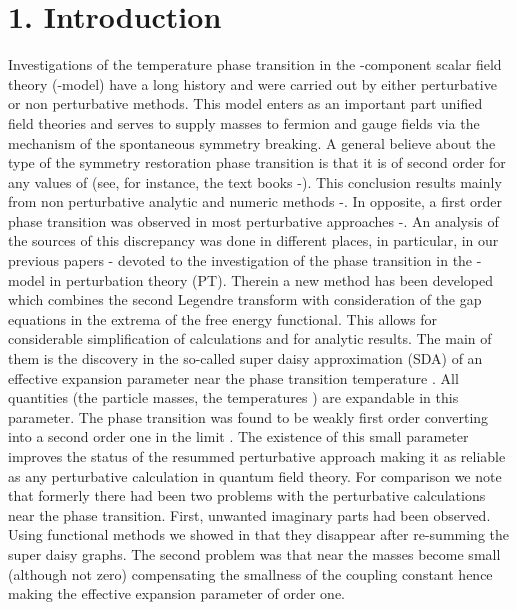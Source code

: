 \documentclass[a4paper,12pt]{article}
\begin{document}
\section*{1. Introduction}
Investigations of the temperature phase transition in the
\coordHE{}-component scalar field theory (\coordHE{}-model) have a long history
and were carried out by either perturbative or non perturbative
methods. This model enters as an important part unified field theories
and serves to supply masses to fermion and gauge fields via the
mechanism of the spontaneous symmetry breaking. A general believe
about the type of the symmetry restoration phase transition is that it
is of second order for any values of \coordHE{} (see, for instance, the text
books \cite{Zinn}-\cite{Kapusta}). This conclusion results mainly from
non perturbative analytic and numeric methods
\cite{Tetradis}-\cite{Fodor}. In opposite, a first order phase
transition was observed in most perturbative approaches
\cite{Takahashi}-\cite{pl}. An analysis of the sources of this
discrepancy was done in different places, in particular, in our
previous papers \cite{Bordag1}-\cite{pl} devoted to the investigation
of the phase transition in the \coordHE{}-model in perturbation theory
(PT). Therein a new method has been developed which combines the
second Legendre transform with consideration of the gap equations in
the extrema of the free energy functional. This allows for
considerable simplification of calculations and for analytic results.
The main of them is the discovery in the so-called super daisy
approximation (SDA) of an effective expansion parameter \coordHE{} near the phase transition temperature \coordHE{}. All
quantities (the particle masses, the temperatures \coordHE{}) are
expandable in this parameter. The phase transition was found to be
weakly first order converting into a second order one in the limit \coordHE{}. The existence of this small parameter improves the status
of the resummed perturbative approach making it as reliable as any
perturbative calculation in quantum field theory. For comparison we
note that formerly there had been two problems with the perturbative
calculations near the phase transition. First, unwanted imaginary
parts had been observed. Using functional methods we showed in
\cite{Bordag1,pl} that they disappear after re-summing the super daisy
graphs. The second problem was that near \coordHE{} the masses become small
(although not zero) compensating the smallness of the coupling
constant hence making the effective expansion parameter of order one.
\end{document}
